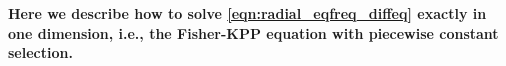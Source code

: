 \documentclass[10pt,letterpaper]{article}
\begin{document}
\textbf{
Here we describe how to solve \eqref{eqn:radial_eqfreq_diffeq} exactly in one dimension,
i.e., the Fisher-KPP equation with piecewise constant selection.
}
\end{document}
